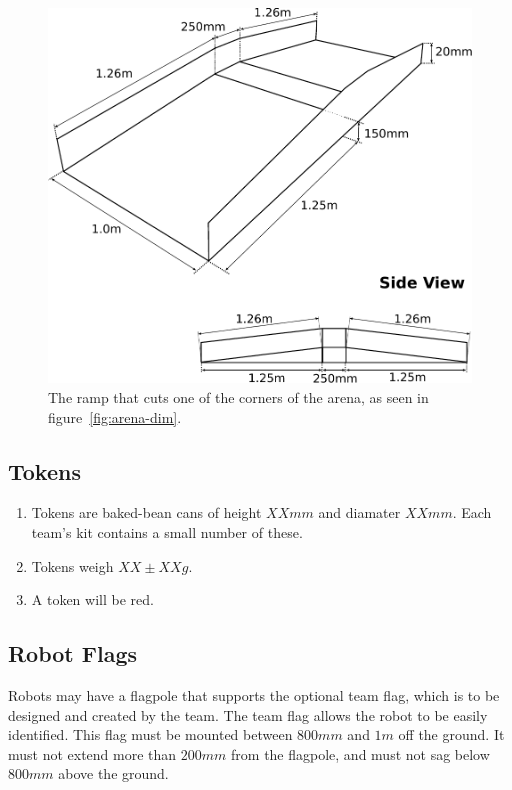 \begin{figure}
  \begin{center}
    \includegraphics[keepaspectratio,width=\textwidth]{./images/ramp-2011.pdf}
  \end{center}
  \caption{\label{fig:ramp-on-its-own}The ramp that cuts one of the corners of the arena, as seen in figure~\ref{fig:arena-dim}.}
\end{figure}

\subsection{Tokens}
\label{tokens}
\begin {enumerate} 
\item Tokens are baked-bean cans of height $XXmm$ and diamater $XXmm$.
 Each team's kit contains a small number of these.
\item Tokens weigh $XX\pm{}XXg$.
\item A token will be red.
\end {enumerate}

\subsection{Robot Flags}
\label{sec:flags}
Robots may have a flagpole that supports the optional team flag, which
is to be designed and created by the team. The team flag allows the
robot to be easily identified.  This flag must be mounted between
$800mm$ and $1m$ off the ground.  It must not extend more than $200mm$
from the flagpole, and must not sag below $800mm$ above the ground.

